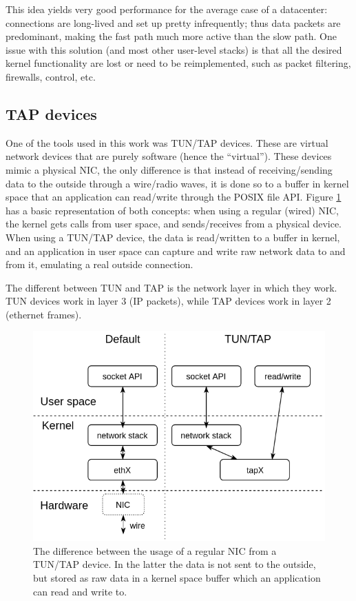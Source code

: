 This idea yields very good performance for the average case of a datacenter: connections are long-lived and set up
pretty infrequently; thus data packets are predominant, making the fast path much more active than the slow path. One 
issue with this solution (and most other user-level stacks) is that all the desired kernel functionality are lost or
need to be reimplemented, such as
packet filtering, firewalls, control, etc.

%
%

\subsection{TAP devices}

One of the tools used in this work was TUN/TAP devices. These are virtual network devices that are purely software 
(hence the ``virtual''). These devices mimic a physical NIC, the only difference is that instead of receiving/sending
data to the outside through a wire/radio waves, it is done so to a buffer in kernel space that an application can read/write
through the POSIX file API. Figure \ref{fig:tap} has a basic representation of both concepts: when using a regular (wired)
NIC, the kernel gets calls from user space, and sends/receives from a physical device. When using a TUN/TAP device, the data is
read/written to a buffer in kernel, and an application in user space can capture and write raw network data to and from it, 
emulating a real outside connection.

The different between TUN and TAP is the network layer in which they work. TUN devices work in layer 3 (IP packets), while TAP
devices work in layer 2 (ethernet frames).


\begin{figure}
\centering
\includegraphics[width=0.7\columnwidth]{figures/tap_diag.png}
\caption{The difference between the usage of a regular NIC from a TUN/TAP device. In the latter the data is not sent to the
outside, but stored as raw data in a kernel space buffer which an application can read and write to.}
\label{fig:tap}
\end{figure}